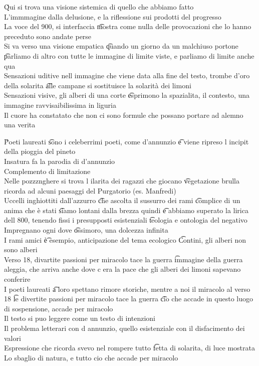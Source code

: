 \documentclass[12pt]{article}
\begin{document}
\v

Qui si trova una visione sistemica di quello che abbiamo fatto \\
L'immmagine dalla delusione, e la riflessione sui prodotti del progresso \\
La voce del 900, si interfaccia \t mostra come nulla delle provocazioni che lo hanno preceduto sono andate perse \\
Si va verso una visione empatica \t quando un giorno da un malchiuso portone \t parliamo di altro con tutte le immagine di limite viste, e parliamo di limite anche qua \\
Sensazioni uditive nell immagine che viene data alla fine del testo, trombe d'oro della solarita \t alle campane si sostituisce la solarità dei limoni \\
Sensazioni visive, gli alberi di una corte \t esprimono la spazialita, il contesto, una immagine ravvisaibilissima in liguria \\
Il cuore ha constatato che non ci sono formule che possano portare ad alemno una verita

\v

Poeti laureati \t sono i celeberrimi poeti, come d'annunzio \t e viene ripreso l incipit della pioggia del pineto \\
Insatura fa la parodia di d'annunzio \\
Complemento di limitazione \\
Nelle pozzznghere si trova l ilarita dei ragazzi che giocano \t vegetazione brulla ricorda ad alcuni paesaggi del Purgatorio (es. Manfredi) \\
Uccelli inghiottiti dall'azzurro \t che ascolta il sussurro dei rami \t complice di un anima che è stati \t siamo lontani dalla brezza quindi \t e abbiamo superato la lirica dell 800, tenendo fissi i presupposti esistenziali \t teologia e ontologia del negativo \\
Impregnano ogni dove \t ossimoro, una dolcezza infinita \\
I rami amici \t è esempio, anticipazione del tema ecologico \t Contini, gli alberi non sono alberi \\
Verso 18, divartite passioni per miracolo tace la guerra \t immagine della guerra aleggia, che arriva anche dove c era la pace che gli alberi dei limoni sapevano conferire \\
I poeti laureati \t a loro spettano rimore storiche, mentre a noi il miracolo al verso 18 \t le divertite passioni per miracolo tace la guerra \t cio che accade in questo luogo di sospensione, accade per miracolo \\
Il testo si puo leggere come un testo di intenzioni \\
Il problema letterari con d annunzio, quello esistenziale con il disfacimento dei valori \\
Espressione che ricorda svevo nel rompere tutto \t fetta di solarita, di luce mostrata \\
Lo sbaglio di natura, e tutto cio che accade per miracolo
\end{document}
